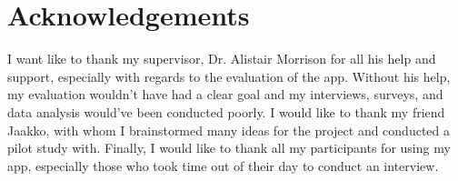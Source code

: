 \documentclass{l4proj}
\begin{document}
\newpage
\chapter*{Acknowledgements}
I want like to thank my supervisor, Dr. Alistair Morrison for all his help and support, especially with regards to the evaluation of the app. Without his help, my evaluation wouldn't have had a clear goal and my interviews, surveys, and data analysis would've been conducted poorly. I would like to thank my friend Jaakko, with whom I brainstormed many ideas for the project and conducted a pilot study with. Finally, I would like to thank all my participants for using my app, especially those who took time out of their day to conduct an interview.


\def\consentname {Eerik Saksi} %
\def\consentdate {31 March 2021} %

\educationalconsent


\tableofcontents

%
%
%
%
%
%
%
%
\end{document}
